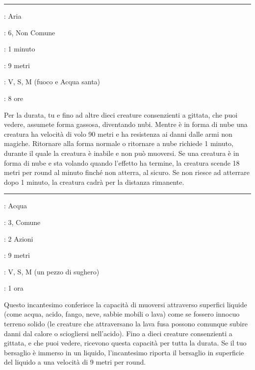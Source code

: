 \begin{multicols}{2}
\smallskip\noindent\rule{\linewidth}{2pt} \hypertarget{Camminare nel Vento}{}\smallskip{}
\noindent
\begin{description}[noitemsep, topsep=0pt, parsep=0pt, partopsep=0pt, leftmargin=0cm, labelwidth=2.8cm]
	\item[\textbf{Lista di Magia}]: Aria
	\item[\textbf{Livello}]: 6, Non Comune
	\item[\textbf{T. di Lancio}]: 1 minuto
	\item[\textbf{Gittata}]: 9 metri
	\item[\textbf{Componenti}]: V, S, M (fuoco e Acqua santa)
	\item[\textbf{Durata}]: 8 ore
\end{description}

Per la durata, tu e fino ad altre dieci creature consenzienti a gittata, che puoi vedere, assumete forma gassosa, diventando nubi. Mentre è in forma di nube una creatura ha velocità di volo 90 metri e ha resistenza ai danni dalle armi non magiche. Ritornare alla forma normale o ritornare a nube richiede 1 minuto, durante il quale la creatura è inabile e non può muoversi. Se una creatura è in forma di nube e sta volando quando l'effetto ha termine, la creatura scende 18 metri per round al minuto finché non atterra, al sicuro. Se non riesce ad atterrare dopo 1 minuto, la creatura cadrà per la distanza rimanente.

\smallskip\noindent\rule{\linewidth}{2pt} \hypertarget{Camminare sull'Acqua}{}\smallskip{}
\noindent
\begin{description}[noitemsep, topsep=0pt, parsep=0pt, partopsep=0pt, leftmargin=0cm, labelwidth=2.8cm]
	\item[\textbf{Lista di Magia}]: Acqua
	\item[\textbf{Livello}]: 3, Comune
	\item[\textbf{T. di Lancio}]: 2 Azioni
	\item[\textbf{Gittata}]: 9 metri
	\item[\textbf{Componenti}]: V, S, M (un pezzo di sughero)
	\item[\textbf{Durata}]: 1 ora
\end{description}

Questo incantesimo conferisce la capacità di muoversi attraverso superfici liquide (come acqua, acido, fango, neve, sabbie mobili o lava) come se fossero innocuo terreno solido (le creature che attraversano la lava fusa possono comunque subire danni dal calore o sciogliersi nell'acido). Fino a dieci creature consenzienti a gittata, e che puoi vedere, ricevono questa capacità per tutta la durata. Se il tuo bersaglio è immerso in un liquido, l'incantesimo riporta il bersaglio in superficie del liquido a una velocità di 9 metri per round.


\end{multicols}
